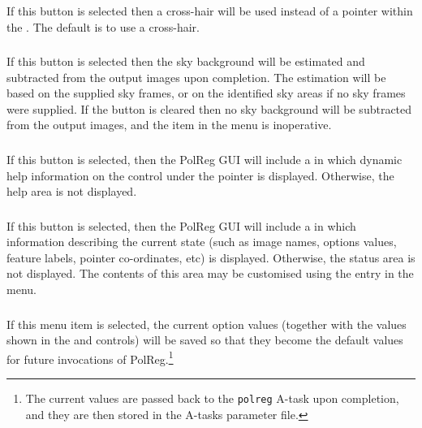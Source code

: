 \subsubsection {}
If this button is selected then a cross-hair will be used instead of a
pointer within the .
The default is to use a cross-hair.

\subsubsection {}
If this button is selected then the sky background will be estimated and
subtracted from the output images upon completion. The estimation will be
based on the supplied sky frames, or on the identified sky areas if no
sky frames were supplied. If the button is cleared then no sky background
will be subtracted from the output images, and the
 item in the
 menu is inoperative.

\subsubsection {} 
If this button is selected, then the PolReg GUI will include a
 in which dynamic help information
on the control under the pointer is displayed. Otherwise, the help area
is not displayed.

\subsubsection {} 
If this button is selected, then the PolReg GUI will include a
 in which information
describing the current state (such as image names, options values, 
feature labels, pointer co-ordinates, etc) is displayed. Otherwise, the
status area is not displayed. The contents of this area may be customised
using the  entry in the
 menu.

\subsubsection {} 
If this menu item is selected, the current option values (together with
the values shown in the 
and  controls) will be saved so that
they become the default values for future invocations of
PolReg.\footnote{The current values are passed back to the {\tt polreg} A-task 
upon completion, and they are then stored in the A-tasks parameter file.}

